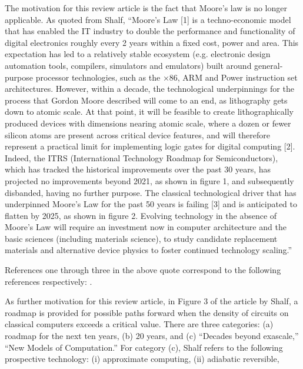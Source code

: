 \documentclass[]{article}
\begin{document}
The motivation for this review article is the fact that Moore's law is no 
longer applicable\cite{moore2021cramming}.
As quoted from Shalf\cite{shalf2020future},
``Moore’s Law [1] is a techno-economic model that has enabled 
the IT industry to double the performance and 
functionality of digital electronics roughly 
every 2 years within a fixed cost, power and area. 
This expectation has led to a relatively stable ecosystem (e.g. 
electronic design automation tools, compilers, simulators and 
emulators) built around general-purpose processor technologies, 
such as the ×86, ARM and Power instruction set architectures. 
However, within a decade, the technological underpinnings 
for the process that Gordon Moore described will come to an end, 
as lithography gets down to atomic scale. At that point, 
it will be feasible to create lithographically produced devices 
with dimensions nearing atomic scale, where a dozen or fewer 
silicon atoms are present across critical device features, and 
will therefore represent a practical limit for implementing logic 
gates for digital computing [2]. Indeed, the ITRS (International 
Technology Roadmap for Semiconductors), which has tracked the 
historical improvements over the past 30 years, has projected no 
improvements beyond 2021, as shown in figure 1, and 
subsequently disbanded, having no further purpose. 
The classical technological driver that has underpinned Moore’s Law 
for the past 50 years is failing [3] and is anticipated to flatten by 
2025, as shown in figure 2. Evolving technology in the absence of 
Moore’s Law will require an investment now in computer 
architecture and the basic sciences (including materials science), 
to study candidate replacement materials and alternative 
device physics to foster continued technology scaling.'' 
\par\noindent
References one through three in the above quote 
correspond to the following references respectively: 
\cite{moore2021cramming}\cite{mack2015multiple}\cite{markov2014limits}.
\par\noindent
As further motivation for this review article,
in Figure 3 of the article by Shalf\cite{shalf2020future}, a 
roadmap is provided for possible paths forward when the 
density of circuits on classical computers exceeds a critical 
value.  There are three categories: (a) roadmap for the next ten years, 
(b) 20 years, and (c) ``Decades beyond exascale,'' 
``New Models of Computation.'' For category (c), Shalf\cite{shalf2020future}
refers to the following
prospective technology:
(i) approximate computing, (ii) adiabatic reversible, 
\end{document}
